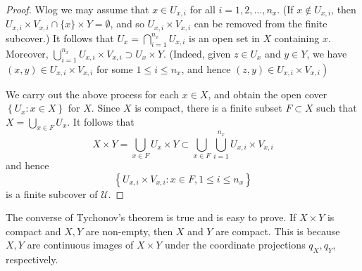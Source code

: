 \documentclass[a4paper,11pt]{article}
\begin{document}
\begin{proof}
Wlog we may assume that $x \in U_{x, i}$ for all $i=1,2, \ldots, n_{x}$. (If $x \notin U_{x, i}$, then $U_{x, i} \times V_{x, i} \cap\{x\} \times Y=\emptyset$, and so $U_{x, i} \times V_{x, i}$ can be removed from the finite subcover.) It follows that $U_{x}=\bigcap_{i=1}^{n_{x}} U_{x, i}$ is an open set in $X$ containing $x$. Moreover, $\bigcup_{i=1}^{n_{x}} U_{x, i} \times V_{x, i} \supset U_{x} \times Y$. (Indeed, given $z \in U_{x}$ and $y \in Y$, we have $(x, y) \in U_{x, i} \times V_{x, i}$ for some $1 \leqslant i \leqslant n_{x}$, and hence $\left.(z, y) \in U_{x, i} \times V_{x, i}\right)$

We carry out the above process for each $x \in X$, and obtain the open cover $\left\{U_{x}: x \in X\right\}$ for $X$. Since $X$ is compact, there is a finite subset $F \subset X$ such that $X=\bigcup_{x \in F} U_{x}$. It follows that
$$
X \times Y=\bigcup_{x \in F} U_{x} \times Y \subset \bigcup_{x \in F} \bigcup_{i=1}^{n_{x}} U_{x, i} \times V_{x, i}
$$
and hence
$$
\left\{U_{x, i} \times V_{x, i}: x \in F, 1 \leqslant i \leqslant n_{x}\right\}
$$
is a finite subcover of $\mathcal{U}$.
\end{proof}

\begin{remark}
    The converse of Tychonov's theorem is true and is easy to prove. If $X \times Y$ is compact and $X, Y$ are non-empty, then $X$ and $Y$ are compact. This is because $X, Y$ are continuous images of $X \times Y$ under the coordinate projections $q_{X}, q_{Y}$, respectively.
\end{remark}
\end{document}
